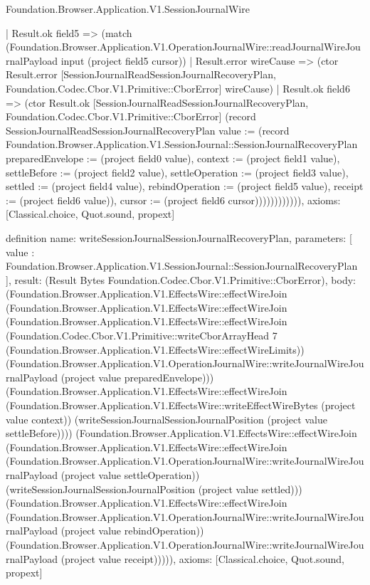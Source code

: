 \begin{lexlean}{Foundation.Browser.Application.V1.SessionJournalWire}
\begin{semanticmodule}
{                  | Result.ok field5 => (match (Foundation.Browser.Application.V1.OperationJournalWire::readJournalWireJournalPayload input (project field5 cursor))
                    | Result.error wireCause => (ctor Result.error [SessionJournalReadSessionJournalRecoveryPlan, Foundation.Codec.Cbor.V1.Primitive::CborError] wireCause)
                    | Result.ok field6 => (ctor Result.ok [SessionJournalReadSessionJournalRecoveryPlan, Foundation.Codec.Cbor.V1.Primitive::CborError] (record SessionJournalReadSessionJournalRecoveryPlan {value := (record Foundation.Browser.Application.V1.SessionJournal::SessionJournalRecoveryPlan {preparedEnvelope := (project field0 value), context := (project field1 value), settleBefore := (project field2 value), settleOperation := (project field3 value), settled := (project field4 value), rebindOperation := (project field5 value), receipt := (project field6 value)}), cursor := (project field6 cursor)}))))))))))),
  axioms: [Classical.choice, Quot.sound, propext]
}

definition{
  name: writeSessionJournalSessionJournalRecoveryPlan,
  parameters: [
    value : Foundation.Browser.Application.V1.SessionJournal::SessionJournalRecoveryPlan
  ],
  result: (Result Bytes Foundation.Codec.Cbor.V1.Primitive::CborError),
  body: (Foundation.Browser.Application.V1.EffectsWire::effectWireJoin (Foundation.Browser.Application.V1.EffectsWire::effectWireJoin (Foundation.Browser.Application.V1.EffectsWire::effectWireJoin (Foundation.Codec.Cbor.V1.Primitive::writeCborArrayHead 7 (Foundation.Browser.Application.V1.EffectsWire::effectWireLimits)) (Foundation.Browser.Application.V1.OperationJournalWire::writeJournalWireJournalPayload (project value preparedEnvelope))) (Foundation.Browser.Application.V1.EffectsWire::effectWireJoin (Foundation.Browser.Application.V1.EffectsWire::writeEffectWireBytes (project value context)) (writeSessionJournalSessionJournalPosition (project value settleBefore)))) (Foundation.Browser.Application.V1.EffectsWire::effectWireJoin (Foundation.Browser.Application.V1.EffectsWire::effectWireJoin (Foundation.Browser.Application.V1.OperationJournalWire::writeJournalWireJournalPayload (project value settleOperation)) (writeSessionJournalSessionJournalPosition (project value settled))) (Foundation.Browser.Application.V1.EffectsWire::effectWireJoin (Foundation.Browser.Application.V1.OperationJournalWire::writeJournalWireJournalPayload (project value rebindOperation)) (Foundation.Browser.Application.V1.OperationJournalWire::writeJournalWireJournalPayload (project value receipt))))),
  axioms: [Classical.choice, Quot.sound, propext]
}


\end{semanticmodule}
\end{lexlean}
